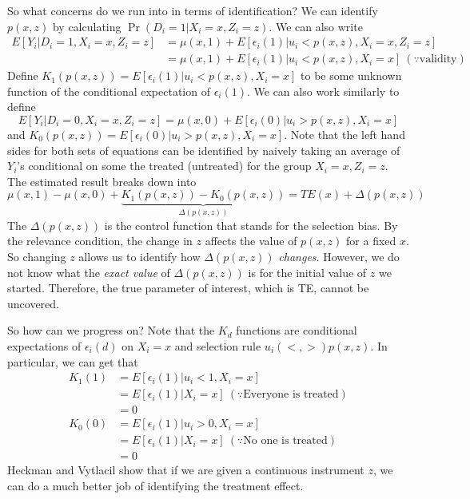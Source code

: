 \par
So what concerns do we run into in terms of identification? We can identify $p(x,z)$ by calculating $\Pr(D_i=1|X_i=x, Z_i=z)$. We can also write
\begin{align*}
E[Y_i|D_i=1, X_i=x, Z_i=z]&=\mu(x,1)+E[\epsilon_i(1)|u_i<p(x,z), X_i=x, Z_i=z]\\
&=\mu(x,1)+E[\epsilon_i(1)|u_i<p(x,z), X_i=x] \ (\because\text{validity})
\end{align*}
Define $K_1(p(x,z))=E[\epsilon_i(1)|u_i<p(x,z), X_i=x]$ to be some unknown function of the conditional expectation of $\epsilon_i(1)$. We can also work similarly to define 
\[
E[Y_i|D_i=0, X_i=x, Z_i=z]=\mu(x,0)+E[\epsilon_i(0)|u_i>p(x,z), X_i=x]
\] 
and $K_0(p(x,z))=E[\epsilon_i(0)|u_i>p(x,z), X_i=x]$. Note that the left hand sides for both sets of equations can be identified by naively taking an average of $Y_i$'s conditional on some the treated (untreated) for the group $X_i=x, Z_i=z$. The estimated result breaks down into
\[
\mu(x,1)-\mu(x,0)+\underbrace{K_1(p(x,z))-K_0(p(x,z)) }_{\Delta(p(x,z))}= TE(x)+\Delta(p(x,z))
\]
The $\Delta(p(x,z))$ is the control function that stands for the selection bias. By the relevance condition, the change in $z$ affects the value of $p(x,z)$ for a fixed $x$. So changing $z$ allows us to identify how $\Delta(p(x,z))$ \textit{changes}. However, we do not know what the \textit{exact value} of $\Delta(p(x,z))$ is for the initial value of $z$ we started. Therefore, the true parameter of interest, which is TE, cannot be uncovered. \par
So how can we progress on? Note that the $K_d$ functions are conditional expectations of $\epsilon_i(d)$ on $X_i=x$ and selection rule $u_i (<,>) p(x,z)$. In particular, we can get that
\begin{align*}
K_1(1) &=E[\epsilon_i(1)|u_i<1,X_i=x] \\
&=E[\epsilon_i(1)|X_i=x] \ (\because\text{Everyone is treated})\\
&=0\\
K_0(0) &=E[\epsilon_i(1)|u_i>0,X_i=x] \\
&=E[\epsilon_i(1)|X_i=x] \ (\because\text{No one is treated})\\
&=0
\end{align*}
Heckman and Vytlacil show that if we are given a continuous instrument $z$, we can do a much better job of identifying the treatment effect. 
